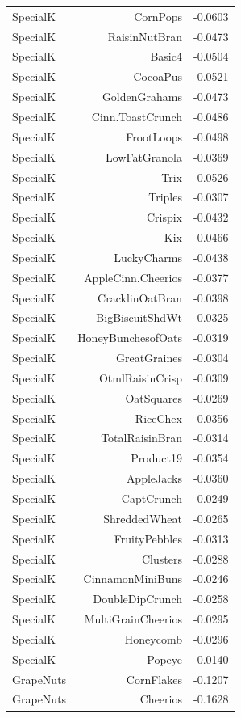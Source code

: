 \begin{longtable}{@{}lrr@{}}
SpecialK & CornPops & -0.0603 \\
SpecialK & RaisinNutBran & -0.0473 \\
SpecialK & Basic4 & -0.0504 \\
SpecialK & CocoaPus & -0.0521 \\
SpecialK & GoldenGrahams & -0.0473 \\
SpecialK & Cinn.ToastCrunch & -0.0486 \\
SpecialK & FrootLoops & -0.0498 \\
SpecialK & LowFatGranola & -0.0369 \\
SpecialK & Trix & -0.0526 \\
SpecialK & Triples & -0.0307 \\
SpecialK & Crispix & -0.0432 \\
SpecialK & Kix & -0.0466 \\
SpecialK & LuckyCharms & -0.0438 \\
SpecialK & AppleCinn.Cheerios & -0.0377 \\
SpecialK & CracklinOatBran & -0.0398 \\
SpecialK & BigBiscuitShdWt & -0.0325 \\
SpecialK & HoneyBunchesofOats & -0.0319 \\
SpecialK & GreatGraines & -0.0304 \\
SpecialK & OtmlRaisinCrisp & -0.0309 \\
SpecialK & OatSquares & -0.0269 \\
SpecialK & RiceChex & -0.0356 \\
SpecialK & TotalRaisinBran & -0.0314 \\
SpecialK & Product19 & -0.0354 \\
SpecialK & AppleJacks & -0.0360 \\
SpecialK & CaptCrunch & -0.0249 \\
SpecialK & ShreddedWheat & -0.0265 \\
SpecialK & FruityPebbles & -0.0313 \\
SpecialK & Clusters & -0.0288 \\
SpecialK & CinnamonMiniBuns & -0.0246 \\
SpecialK & DoubleDipCrunch & -0.0258 \\
SpecialK & MultiGrainCheerios & -0.0295 \\
SpecialK & Honeycomb & -0.0296 \\
SpecialK & Popeye & -0.0140 \\
GrapeNuts & CornFlakes & -0.1207 \\
GrapeNuts & Cheerios & -0.1628 \\

\end{longtable}
